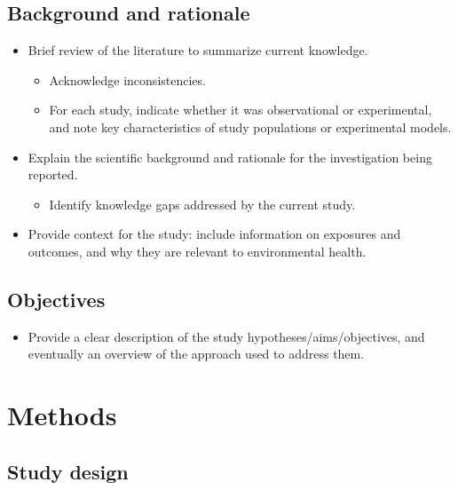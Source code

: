 \documentclass[
  letterpaper,
  DIV=11,
  numbers=noendperiod]{scrartcl}
\providecommand{\tightlist}{%
  \setlength{\itemsep}{0pt}\setlength{\parskip}{0pt}}\usepackage{longtable,booktabs,array}
\begin{document}
\subsection{Background and rationale}\label{sec-background}

\begin{itemize}
\tightlist
\item
  Brief review of the literature to summarize current knowledge.

  \begin{itemize}
  \tightlist
  \item
    Acknowledge inconsistencies.
  \item
    For each study, indicate whether it was observational or
    experimental, and note key characteristics of study populations or
    experimental models.
  \end{itemize}
\item
  Explain the scientific background and rationale for the investigation
  being reported.

  \begin{itemize}
  \tightlist
  \item
    Identify knowledge gaps addressed by the current study.
  \end{itemize}
\item
  Provide context for the study: include information on exposures and
  outcomes, and why they are relevant to environmental health.
\end{itemize}

\subsection{Objectives}\label{sec-objectives}

\begin{itemize}
\tightlist
\item
  Provide a clear description of the study hypotheses/aims/objectives,
  and eventually an overview of the approach used to address them.
\end{itemize}

\section{Methods}\label{sec-methods}

\subsection{Study design}\label{sec-design}
\end{document}
